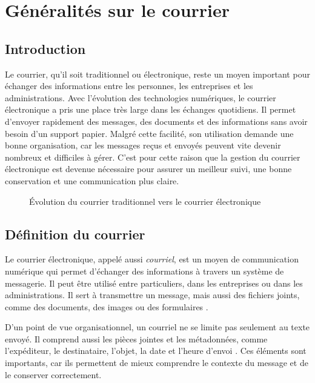 \chapter{Généralités sur le courrier}
\label{chap:generalites_courrier}

\section{Introduction}
\label{sec:introduction_generalites_courrier}

Le courrier, qu’il soit traditionnel ou électronique, reste un moyen important pour échanger des informations entre les personnes, les entreprises et les administrations. Avec l’évolution des technologies numériques, le courrier électronique a pris une place très large dans les échanges quotidiens. Il permet d’envoyer rapidement des messages, des documents et des informations sans avoir besoin d’un support papier. Malgré cette facilité, son utilisation demande une bonne organisation, car les messages reçus et envoyés peuvent vite devenir nombreux et difficiles à gérer. C’est pour cette raison que la gestion du courrier électronique est devenue nécessaire pour assurer un meilleur suivi, une bonne conservation et une communication plus claire.

\begin{figure}[H]
    \centering
    \caption{Évolution du courrier traditionnel vers le courrier électronique}
    \label{fig:evolution_courrier}
\end{figure}

\section{Définition du courrier}
\label{sec:definition_courrier}

Le courrier électronique, appelé aussi \textit{courriel}, est un moyen de communication numérique qui permet d’échanger des informations à travers un système de messagerie. Il peut être utilisé entre particuliers, dans les entreprises ou dans les administrations. Il sert à transmettre un message, mais aussi des fichiers joints, comme des documents, des images ou des formulaires \cite{bissonnette2012}.

D’un point de vue organisationnel, un courriel ne se limite pas seulement au texte envoyé. Il comprend aussi les pièces jointes et les métadonnées, comme l’expéditeur, le destinataire, l’objet, la date et l’heure d’envoi \cite{piaf}. Ces éléments sont importants, car ils permettent de mieux comprendre le contexte du message et de le conserver correctement.



